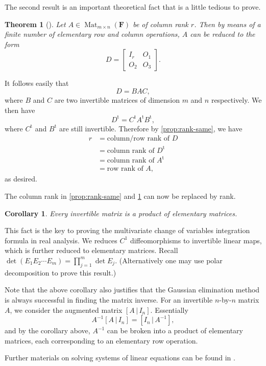 \documentclass[10pt]{article}
\numberwithin{equation}{section}
\theoremstyle{plain-star}
\newtheorem{thm}[equation]{Theorem}
\newtheorem{cor}[equation]{Corollary}
\theoremstyle{definition-star}
\theoremstyle{remark-star}
\theoremstyle{plain-star}
\newcommand{\F}{\mathbf{F}}
\newcommand{\Mat}{\operatorname{Mat}}
\newcommand{\trp}{\mathrm{t}}
\begin{document}
The second result is an important theoretical fact that is a little tedious to prove.
\begin{thm}[{\cite[Theorem 3.6]{friedberg2003linear}}]\label{thm:reduced-form}
    Let $A \in \Mat_{m\times n}(\F)$ be of column rank $r$. Then by means of a finite number of elementary row and column operations, $A$ can be reduced to the form \[
        D = \begin{bmatrix}
            I_r & O_1 \\
            O_2 & O_3
        \end{bmatrix}.
    \]
\end{thm}
It follows easily that \[D = BAC,\] where $B$ and $C$ are two invertible matrices of dimension $m$ and $n$ respectively. We then have \[
    D^\trp = C^\trp A^\trp B^\trp,
\] where $C^\trp$ and $B^\trp$ are still invertible. Therefore by \cref{prop:rank-same}, we have \begin{align*}
    r & = \text{column/row rank of } D \\
    & = \text{column rank of } D^\trp \\
    & = \text{column rank of } A^\trp \\
    & = \text{row rank of } A,
\end{align*}
as desired.

The column rank in \cref{prop:rank-same} and \cref{thm:reduced-form} can now be replaced by rank.

\begin{cor}
    Every invertible matrix is a product of elementary matrices.
\end{cor}
This fact is the key to proving the multivariate change of variables integration formula in real analysis. We reduces $C^1$ diffeomorphisms to invertible linear maps, which is further reduced to elementary matrices. Recall $\det (E_1 E_2 \dotsm E_m) = \prod_{j=1}^m \det E_j$. (Alternatively one may use polar decomposition to prove this result.)

Note that the above corollary also justifies that the Gaussian elimination method is always successful in finding the matrix inverse. For an invertible $n$-by-$n$ matrix $A$, we consider the augmented matrix $[A \,\vert\, I_n]$. Essentially \[
    A^{-1}[A \,\vert\, I_n] = [I_n \,\vert\, A^{-1}],
\] and by the corollary above, $A^{-1}$ can be broken into a product of elementary matrices, each corresponding to an elementary row operation.

Further materials on solving systems of linear equations can be found in \cite[Sections 3.3 and 3.4]{friedberg2003linear}.
\end{document}
